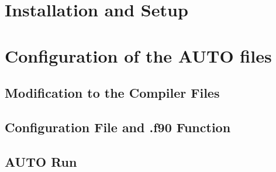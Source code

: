 

\section{Installation and Setup}

\section{Configuration of the AUTO files}

\subsection{Modification to the Compiler Files}

\subsection{Configuration File and .f90 Function}

\subsection{AUTO Run}





